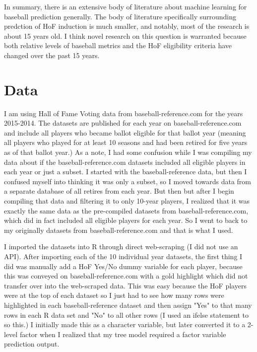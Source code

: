 \documentclass[12pt,english]{article}
\begin{document}
In summary, there is an extensive body of literature about machine learning for baseball prediction generally. The body of literature specifically surrounding predction of HoF induction is much smaller, and notably, most of the research is about 15 years old. I think novel research on this question is warranted because both relative levels of baseball metrics and the HoF eligibility criteria have changed over the past 15 years. 


\section{Data}\label{sec:data}
I am using Hall of Fame Voting data from baseball-reference.com for the years 2015-2014. The datasets are published for each year on baseball-reference.com and include all players who became ballot eligible for that ballot year (meaning all players who played for at least 10 seasons and had been retired for five years as of that ballot year.) As a note, I had some confusion while I was compiling my data about if the baseball-reference.com datasets included all eligible players in each year or just a subset. I started with the baseball-reference data, but then I confused myself into thinking it was only a subset, so I moved towards data from a separate database of all retires from each year. But then but after I begin compiling that data and filtering it to only 10-year players, I realized that it was exactly the same data as the pre-compiled datasets from baseball-reference.com, which did in fact included all eligible players for each year. So I went to back to my originally datasets from baseball-reference.com and that is what I used. 

I imported the datasets into R through direct web-scraping (I did not use an API). After importing each of the 10 individual year datasets, the first thing I did was manually add a HoF Yes/No dummy variable for each player, because this was conveyed on baseball-reference.com with a gold highlight which did not transfer over into the web-scraped data. This was easy because the HoF players were at the top of each dataset so I just had to see how many rows were highlighted in each baseball-reference dataset and then assign "Yes" to that many rows in each R data set and "No" to all other rows (I used an ifelse statement to so this.) I initially made this as a character variable, but later converted it to a 2-level factor when I realized that my tree model required a factor variable prediction output. 
\end{document}
